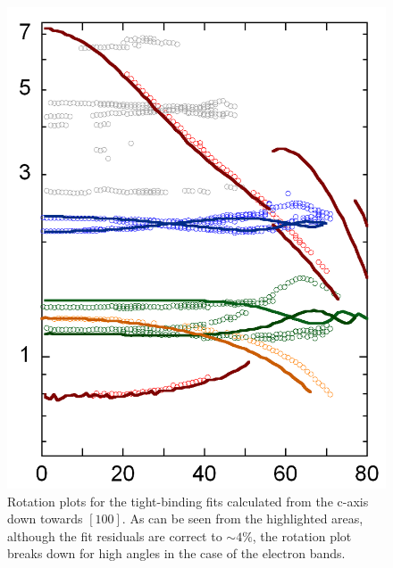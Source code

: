 {{{\begin{figure}[h!]
    \begin{center}
        \includegraphics[scale=0.9]{Chapter3-dHvABaFe2P2/Figures/AngleDepMeasurements/TightBindingFits/TightBindingFits}
        \caption{Rotation plots for the tight-binding fits calculated from the c-axis down towards $[100]$. As can be seen from the highlighted areas, although the fit residuals are correct to $\sim4\%$, the rotation plot breaks down for high angles in the case of the electron bands.}
        \label{Fig:3:FullBandCharacterFermiSurface}
    \end{center}
\end{figure}

}}}
